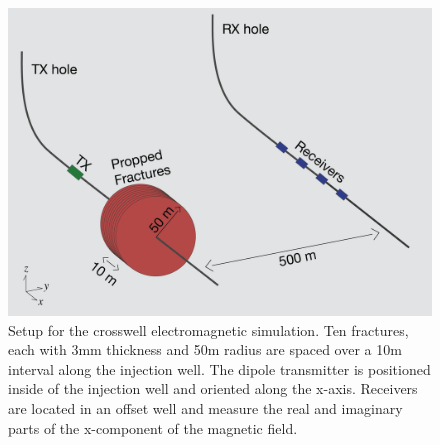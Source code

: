 \begin{figure}
    \begin{center}
    \includegraphics[width=\textwidth]{figures/phys_prop_model/crosswell_fractures.png}
    \end{center}
\caption{
    Setup for the crosswell electromagnetic simulation. Ten fractures, each with 3mm thickness
    and 50m radius are spaced over a 10m interval along the injection well. The dipole transmitter
    is positioned inside of the injection well and oriented along the x-axis. Receivers are located
    in an offset well and measure the real and imaginary parts of the x-component of the magnetic field.
}
\label{fig:crosswell_fractures}
\end{figure}
